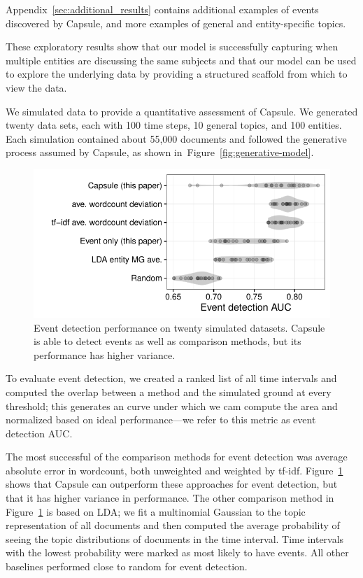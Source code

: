 Appendix~\ref{sec:additional_results} contains additional examples of events discovered by Capsule, and more examples of general and entity-specific topics.

These exploratory results show that our model is successfully capturing when multiple entities are discussing the same subjects and that our model can be used to explore the underlying data by providing a structured scaffold from which to view the data.

  We simulated data to provide a quantitative assessment of Capsule.
We generated twenty data sets, each with 100 time steps, 10 general topics, and 100 entities. Each simulation contained about 55,000 documents and followed the generative process assumed by Capsule, as shown in~Figure~\ref{fig:generative-model}.

\begin{figure}[h]
\centering
\includegraphics[width=\linewidth]{fig/sim_eventdetect.pdf}
\caption{Event detection performance on twenty simulated datasets.  Capsule is able to detect events as well as comparison methods, but its performance has higher variance.}
\label{fig:sim_eventdetect}
\end{figure}

To evaluate event detection, we created a ranked list of all time intervals and computed the overlap between a method and the simulated ground at every threshold; this generates an curve under which we cam compute the area and normalized based on ideal performance---we refer to this metric as event detection AUC. 

 
The most successful of the comparison methods for event detection was average absolute error in wordcount, both unweighted and weighted by tf-idf.  Figure~\ref{fig:sim_eventdetect} shows that Capsule can outperform these approaches for event detection, but that it has higher variance in performance.  The other comparison method in Figure~\ref{fig:sim_eventdetect} is based on LDA; we fit a multinomial Gaussian to the topic representation of all documents and then computed the average probability of seeing the topic distributions of documents in the time interval.  Time intervals with the lowest probability were marked as most likely to have events.  All other baselines performed close to random for event detection.

